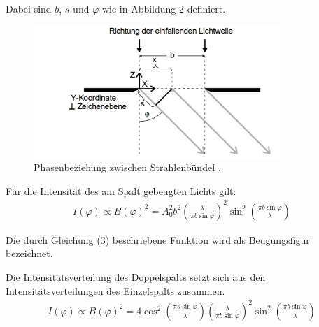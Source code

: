Dabei sind $b$, $s$ und $\varphi$ wie in Abbildung 2 definiert.

\begin{figure}[H]
  \centering
  \includegraphics[height=5cm]{beugung.PNG}
  \caption{Phasenbeziehung zwischen Strahlenbündel \cite{sample}.}
  \label{fig:biegungbild1}
\end{figure}



Für die Intensität des am Spalt gebeugten Lichts gilt:
\begin{align}
  I(\varphi) \propto B(\varphi)^2 = A_0^2 b^2 \left(\frac{\lambda}{\pi b \sin{\varphi}} \right)^2  \sin^2{\left(\frac{\pi b \sin{\varphi}}{\lambda}\right)}
\end{align}

Die durch Gleichung (3) beschriebene Funktion wird als Beugungsfigur bezeichnet.

Die Intensitätsverteilung des Doppelspalts setzt sich aus den Intensitätsverteilungen des Einzelspalts zusammen.
\begin{align}
   I(\varphi) \propto B(\varphi)^2 = 4 \cos^2{\left(\frac{\pi s \sin{\varphi}}{\lambda}\right)} \left(\frac{\lambda}{\pi b \sin{\varphi}}\right)^2
   \sin^2{\left(\frac{\pi b \sin{\varphi}}{\lambda}\right)}
\end{align}
